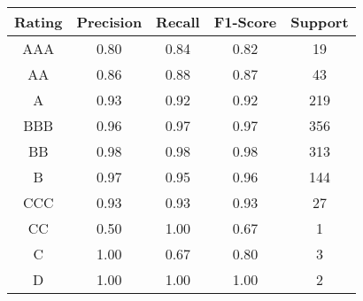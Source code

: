 \footnotesize
\begin{tabular}{ccccc}
\toprule
Rating & Precision & Recall & F1-Score & Support \\
\midrule
AAA & 0.80 & 0.84 & 0.82 & 19 \\
AA & 0.86 & 0.88 & 0.87 & 43 \\
A & 0.93 & 0.92 & 0.92 & 219 \\
BBB & 0.96 & 0.97 & 0.97 & 356 \\
BB & 0.98 & 0.98 & 0.98 & 313 \\
B & 0.97 & 0.95 & 0.96 & 144 \\
CCC & 0.93 & 0.93 & 0.93 & 27 \\
CC & 0.50 & 1.00 & 0.67 & 1 \\
C & 1.00 & 0.67 & 0.80 & 3 \\
D & 1.00 & 1.00 & 1.00 & 2 \\
\bottomrule
\end{tabular}

\normalsize
